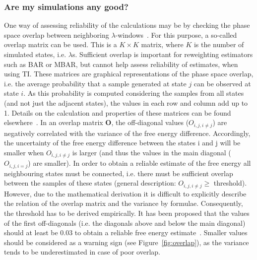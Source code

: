 \documentclass[9pt,bestpractices]{livecoms}
\begin{document}
\subsubsection*{Are my simulations any good?}
One way of assessing reliability of the calculations may be by checking the phase space overlap between neighboring $\lambda$-windows~\cite{wu2005phasespace,wu2005phasespacea}. For this purpose, a so-called overlap matrix can be used. This is a $K\times K$ matrix, where $K$ is the number of simulated states, i.e. $\lambda$s. Sufficient overlap is important for reweighting estimators such as BAR or MBAR, but cannot help assess reliability of estimates, when using TI. 
These matrices are graphical representations of the phase space overlap, i.e. the average probability that a sample generated at state $j$ can be observed at state $i$. As this probability is computed considering the samples from all states (and not just the adjacent states), the values in each row and column add up to 1. Details on the calculation and properties of these matrices can be found elsewhere~\cite{klimovich2015guidelines}.
In an overlap matrix $\mathbf{O}$, the off-diagonal values (${O}_{i,j,i\ne j}$) are negatively correlated with the variance of the free energy difference. Accordingly, the uncertainty of the free energy difference between the states i and j will be smaller when ${O}_{i,j,i\ne j}$ is larger (and thus the values in the main diagonal (${O}_{i,j,i=j}$) are smaller). In order to obtain a reliable estimate of the free energy all neighbouring states must be connected, i.e. there must be sufficient overlap between the samples of these states (general description: ${O}_{i,j,i\ne j}\ge$ threshold).
However, due to the mathematical derivation it is difficult to explicitly describe the relation of the overlap matrix and the variance by formulae. Consequently, the threshold has to be derived empirically. It has been proposed that the values of the first off-diagonals (i.e. the diagonals above and below the main diagonal) should at least be 0.03 to obtain a reliable free energy estimate~\cite{klimovich2015guidelines}. Smaller values should be considered as a warning sign (see Figure~\ref{fig:overlap}), as the variance tends to be underestimated in case of poor overlap.
\end{document}
